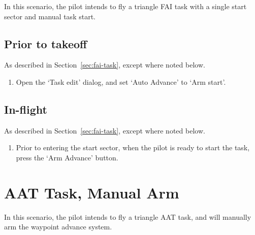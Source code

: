 \documentclass[a4paper,12pt]{refrep}
\begin{document}
In this scenario, the pilot intends to fly a triangle FAI task with a
single start sector and manual task start.

\subsection*{Prior to takeoff}
As described in Section~\ref{sec:fai-task}, except where noted below.
\begin{enumerate}
\item Open the `Task edit' dialog, and set `Auto Advance' to `Arm start'.
\end{enumerate}

\subsection*{In-flight}
As described in Section~\ref{sec:fai-task}, except where noted below.
\begin{enumerate}
\item Prior to entering the start sector, when the pilot is ready to start the task, press the `Arm Advance' button.
\end{enumerate}

\section{AAT Task, Manual Arm}\label{sec:aat-task-manual}

In this scenario, the pilot intends to fly a triangle AAT task, and
will manually arm the waypoint advance system.
\end{document}
